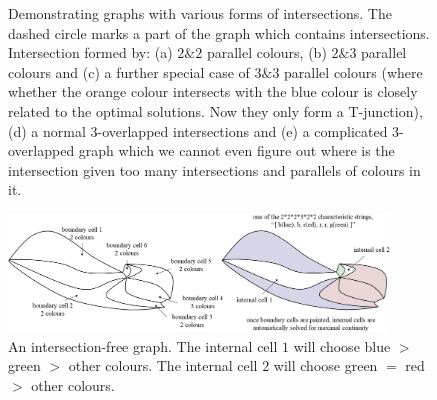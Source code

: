 \documentclass[journal]{IEEEtran}
\begin{document}
\begin{figure}[t]
\centering
\caption{Demonstrating graphs with various forms of intersections. 
The dashed circle marks a part of the graph which contains intersections. 
Intersection formed by: (a) $2\&2$ parallel colours, (b) $2\&3$ parallel colours and (c) a further special case of $3\&3$ parallel colours (where whether the orange colour intersects with the blue colour is closely related to the optimal solutions. Now they only form a T-junction), (d) a normal $3$-overlapped intersections and (e) a complicated $3$-overlapped graph which we cannot even figure out where is the intersection given too many intersections and parallels of colours in it. }\label{fig:three_overlapped_graph}
\end{figure}

\begin{figure}[t]
\centering
\includegraphics[width=0.9\textwidth]{figures/characteristic_string_2}
\caption{An intersection-free graph. The internal cell $1$ will choose blue $>$ green $>$ other colours. The internal cell $2$ will choose green $=$ red $>$ other colours.}\label{fig:characteristic_string}
\end{figure}
\end{document}
